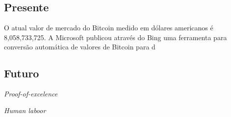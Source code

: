 \documentclass[a4paper,11pt]{article}
\theoremstyle{mytheor}
\begin{document}
\subsection*{Presente}
O atual valor de mercado do Bitcoin medido em dólares americanos é 8,058,733,725.
A Microsoft publicou \cite{bing} através do Bing uma ferramenta para conversão automática de valores de Bitcoin para d

\cite{realTime}
\subsection*{Futuro}

\textit{Proof-of-excelence}

\textit{Human laboor}


{}

\end{document}
